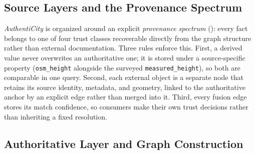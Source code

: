 \documentclass[sigconf,authordraft]{acmart}
\newcommand{\benchname}{\textit{Authenti\-City}}
\begin{document}
\subsection{Source Layers and the Provenance Spectrum}\label{subsec:provenance_spectrum}

\benchname{} is organized around an explicit \emph{provenance spectrum} (): every fact belongs to one of four trust classes recoverable directly from the graph structure rather than external documentation. Three rules enforce this. First, a derived value never overwrites an authoritative one; it is stored under a source-specific property (\texttt{osm\_height} alongside the surveyed \texttt{measured\_height}), so both are comparable in one query. Second, each external object is a separate node that retains its source identity, metadata, and geometry, linked to the authoritative anchor by an explicit edge rather than merged into it. Third, every fusion edge stores its match confidence, so consumers make their own trust decisions rather than inheriting a fixed resolution.


\subsection{Authoritative Layer and Graph Construction}\label{subsec:construction}
\end{document}
